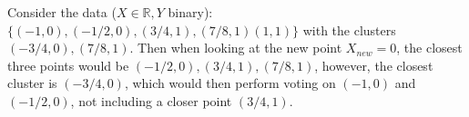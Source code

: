\tffalse

Consider the data ($X \in \mathbb{R}, Y$ binary): $\{ (-1,0), (-1/2, 0), (3/4, 1), (7/8,1) (1,1)\}$ with the clusters $(-3/4, 0), (7/8, 1)$. Then when looking at the new point $X_{new} = 0$, the closest three points would be $(-1/2, 0), (3/4,1), (7/8, 1)$, however, the closest cluster is $(-3/4,0)$, which would then perform voting on $(-1,0)$ and $(-1/2,0)$, not including a closer point $(3/4,1)$.

